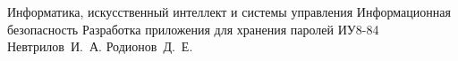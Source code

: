 \documentclass{bmstu}
\begin{document}
\makecourseworktitle
{Информатика, искусственный интеллект и системы управления} %
{Информационная безопасность} %
{Разработка приложения для хранения паролей} %
{ИУ8-84} %
{Невтрилов~И.~А.} %
{Родионов~Д.~Е.} %
{}
{}

\maketableofcontents











\makebibliography


\end{document}
